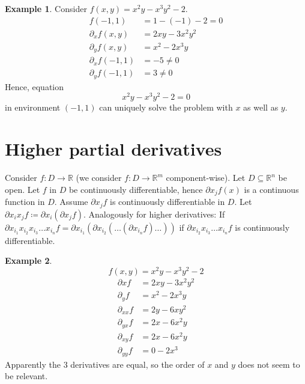 \documentclass[a4paper,landscape,twocolumn]{article}
\theoremstyle{definition}
\newtheorem{ex}{Example}
\begin{document}
\begin{ex}
  Consider $f(x,y) = x^2 y - x^3 y^2 - 2$.
  \begin{align*}
    f(-1, 1) &= 1 - (-1) - 2 = 0 \\
    \partial_x f(x,y) &= 2xy - 3 x^2 y^2 \\
    \partial_y f(x,y) &= x^2 - 2 x^3 y \\
    \partial_x f(-1,1) &= -5  \neq 0 \\
    \partial_y f(-1,1) &= 3   \neq 0
  \end{align*}
  Hence, equation
  \[ x^2 y - x^3 y^2 - 2 = 0 \]
  in environment $(-1, 1)$ can uniquely solve
  the problem with $x$ as well as $y$.
\end{ex}

\section{Higher partial derivatives}

Consider $f: D \to \mathbb R$ (we consider
$f: D \to \mathbb R^m$ component-wise).
Let $D \subseteq \mathbb R^n$ be open.
Let $f$ in $D$ be continuously differentiable,
hence $\partial x_j f(x)$ is a continuous function
in $D$. Assume $\partial x_j f$ is continuously
differentiable in $D$. Let $\partial x_i x_j f
\coloneqq \partial x_i (\partial x_j f)$.
Analogously for higher derivatives: If
$\partial x_{i_1} x_{i_2} x_{i_3} \ldots x_{i_n} f
= \partial x_{i_1} (\partial x_{i_2} (\ldots (\partial x_{i_n} f) \ldots))$
if $\partial x_{i_2} x_{i_3} \ldots x_{i_n} f$
is continuously differentiable.

\begin{ex}
  \[ f(x, y) = x^2 y - x^3 y^2 - 2 \]
  \begin{align*}
    \partial x f &= 2xy - 3x^2 y^2 \\
    \partial_y f &= x^2 - 2x^3 y \\
    \partial_{xx} f &= 2y - 6xy^2 \\
    \partial_{yx} f &= 2x - 6x^2y \\
    \partial_{xy} f &= 2x - 6x^2 y \\
    \partial_{yy} f &= 0 - 2x^3
  \end{align*}
  Apparently the 3 derivatives are equal,
  so the order of $x$ and $y$ does not seem to be relevant.
\end{ex}
\end{document}
